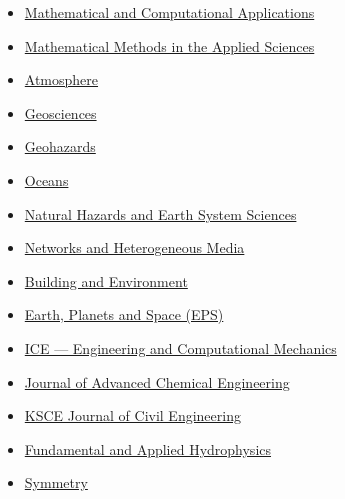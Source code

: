 \documentclass[final, a4paper, oneside, 12pt]{article}
\numberwithin{equation}{section}
\begin{document}
\begin{itemize}
    \item \href{https://www.mdpi.com/journal/mca}{Mathematical and Computational Applications}
    
    \item \href{https://onlinelibrary.wiley.com/journal/10991476/}{Mathematical Methods in the Applied Sciences}

    \item \href{https://www.mdpi.com/journal/atmosphere/}{Atmosphere}
    
    \item \href{https://www.mdpi.com/journal/geosciences/}{Geosciences}

    \item \href{https://www.mdpi.com/journal/geohazards/}{Geohazards}

    \item \href{https://www.mdpi.com/journal/oceans/}{Oceans}
    
    \item \href{http://www.nat-hazards-earth-syst-sci.net/}%
    {Natural Hazards and Earth System Sciences}

    \item \href{https://www.aimspress.com/journal/nhm/}{Networks and Heterogeneous Media}

    \item \href{https://www.sciencedirect.com/journal/building-and-environment}%
    {Building and Environment}
    
    \item \href{http://www.terrapub.co.jp/journals/EPS/}{Earth, Planets and Space (EPS)}
    
    \item \href{http://www.icevirtuallibrary.com/content/serial/eacm/}{ICE --- Engineering and Computational Mechanics}
    
    \item \href{http://www.ashdin.com/journals/jace/jace.aspx}{Journal of Advanced Chemical Engineering}
    
    \item \href{http://www.springer.com/engineering/civil+engineering/journal/12205}{KSCE Journal of Civil Engineering}
    
    \item \href{http://hydrophysics.info/?lang=en}{Fundamental and Applied Hydrophysics}
    
    \item \href{http://www.mdpi.com/journal/symmetry}{Symmetry}
    

\end{itemize}
\end{document}
